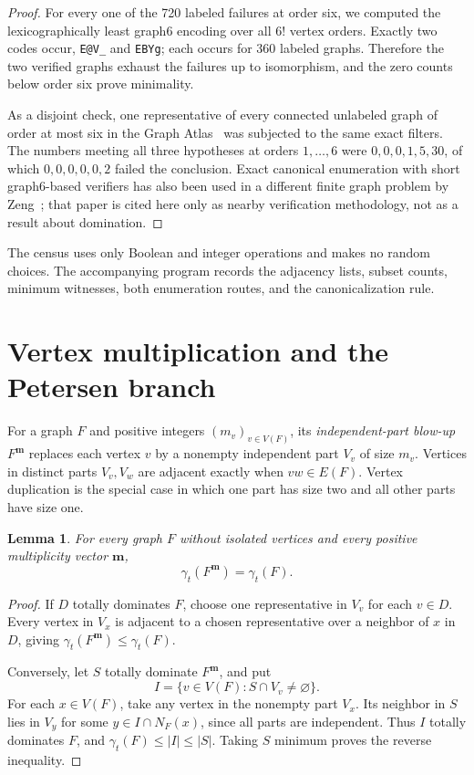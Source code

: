 \documentclass[11pt]{article}
\newtheorem{lemma}[theorem]{Lemma}
\theoremstyle{remark}
\begin{document}
\begin{proof}
For every one of the 720 labeled failures at order six, we computed the
lexicographically least graph6 encoding over all \(6!\) vertex orders.  Exactly
two codes occur, \texttt{E@V\_} and \texttt{EBYg}; each occurs for 360 labeled
graphs.  Therefore the two verified graphs exhaust the failures up to
isomorphism, and the zero counts below order six prove minimality.

As a disjoint check, one representative of every connected unlabeled graph of
order at most six in the Graph Atlas~\cite{ReadWilson1998} was subjected to the
same exact filters.  The numbers meeting all three hypotheses at orders
\(1,\ldots,6\) were \(0,0,0,1,5,30\), of which \(0,0,0,0,0,2\) failed the
conclusion.  Exact canonical enumeration with short graph6-based verifiers has
also been used in a different finite graph problem by
Zeng~\cite{Zeng2026Whiskered}; that paper is cited here only as nearby
verification methodology, not as a result about domination.
\end{proof}

The census uses only Boolean and integer operations and makes no random
choices.  The accompanying program records the adjacency lists, subset counts,
minimum witnesses, both enumeration routes, and the canonicalization rule.

\section{Vertex multiplication and the Petersen branch}

For a graph \(F\) and positive integers \((m_v)_{v\in V(F)}\), its
\emph{independent-part blow-up} \(F^{\mathbf m}\) replaces each vertex \(v\)
by a nonempty independent part \(V_v\) of size \(m_v\).  Vertices in distinct
parts \(V_v,V_w\) are adjacent exactly when \(vw\in E(F)\).  Vertex
duplication is the special case in which one part has size two and all other
parts have size one.

\begin{lemma}\label{lem:blowup}
For every graph \(F\) without isolated vertices and every positive
multiplicity vector \(\mathbf m\),
\[
\gamma_t(F^{\mathbf m})=\gamma_t(F).
\]
\end{lemma}

\begin{proof}
If \(D\) totally dominates \(F\), choose one representative in \(V_v\) for
each \(v\in D\).  Every vertex in \(V_x\) is adjacent to a chosen
representative over a neighbor of \(x\) in \(D\), giving
\(\gamma_t(F^{\mathbf m})\leq\gamma_t(F)\).

Conversely, let \(S\) totally dominate \(F^{\mathbf m}\), and put
\[
I=\{v\in V(F):S\cap V_v\neq\varnothing\}.
\]
For each \(x\in V(F)\), take any vertex in the nonempty part \(V_x\).  Its
neighbor in \(S\) lies in \(V_y\) for some \(y\in I\cap N_F(x)\), since all
parts are independent.  Thus \(I\) totally dominates \(F\), and
\(\gamma_t(F)\leq |I|\leq |S|\).  Taking \(S\) minimum proves the reverse
inequality.
\end{proof}
\end{document}
